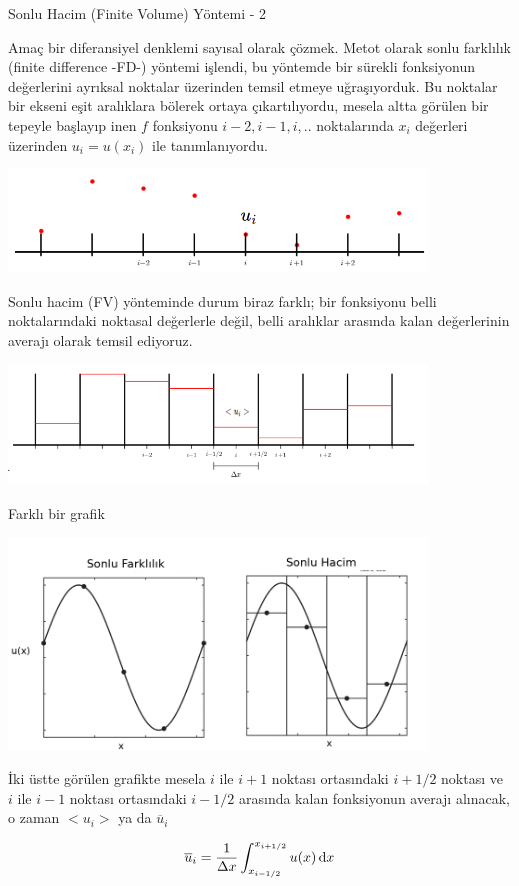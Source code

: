 \documentclass[12pt,fleqn]{article}\usepackage{../../common}
\begin{document}
Sonlu Hacim (Finite Volume) Yöntemi - 2

Amaç bir diferansiyel denklemi sayısal olarak çözmek. Metot olarak sonlu
farklılık (finite difference -FD-) yöntemi işlendi, bu yöntemde bir sürekli
fonksiyonun değerlerini ayrıksal noktalar üzerinden temsil etmeye uğraşıyorduk.
Bu noktalar bir ekseni eşit aralıklara bölerek ortaya çıkartılıyordu, mesela
altta görülen bir tepeyle başlayıp inen $f$ fonksiyonu $i-2,i-1,i,..$
noktalarında $x_i$ değerleri üzerinden $u_i = u(x_i)$ ile tanımlanıyordu.

\includegraphics[width=30em]{13-22-29.png}

Sonlu hacim (FV) yönteminde durum biraz farklı; bir fonksiyonu belli
noktalarındaki noktasal değerlerle değil, belli aralıklar arasında kalan
değerlerinin averajı olarak temsil ediyoruz.

\includegraphics[width=30em]{13-22-34.png}

Farklı bir grafik

\includegraphics[width=30em]{13-16-00.png}

İki üstte görülen grafikte mesela $i$ ile $i+1$ noktası ortasındaki $i+1/2$
noktası ve $i$ ile $i-1$ noktası ortasındaki $i-1/2$ arasında kalan fonksiyonun
averajı alınacak, o zaman $< u_i >$ ya da $\overline{u}_i$

$$
\overline{u}_i = \frac{1}{\Delta x} \int _{x_{i-1/2}}^{x_{i+1/2}} u(x) \,\mathrm{d} x
$$
\end{document}
